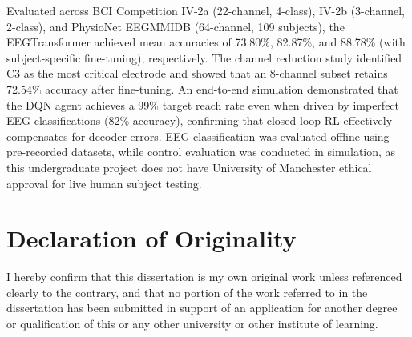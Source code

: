 \documentclass[12pt, a4paper]{article}
\begin{document}
Evaluated across BCI Competition IV-2a (22-channel, 4-class), IV-2b (3-channel, 2-class), and PhysioNet EEGMMIDB (64-channel, 109 subjects), the EEGTransformer achieved mean accuracies of 73.80\%, 82.87\%, and 88.78\% (with subject-specific fine-tuning), respectively. The channel reduction study identified C3 as the most critical electrode and showed that an 8-channel subset retains 72.54\% accuracy after fine-tuning. An end-to-end simulation demonstrated that the DQN agent achieves a 99\% target reach rate even when driven by imperfect EEG classifications (82\% accuracy), confirming that closed-loop RL effectively compensates for decoder errors. EEG classification was evaluated offline using pre-recorded datasets, while control evaluation was conducted in simulation, as this undergraduate project does not have University of Manchester ethical approval for live human subject testing.
\clearpage

\section*{Declaration of Originality}
I hereby confirm that this dissertation is my own original work unless referenced clearly to the contrary, and that no portion of the work referred to in the dissertation has been submitted in support of an application for another degree or qualification of this or any other university or other institute of learning.
\clearpage

\end{document}
